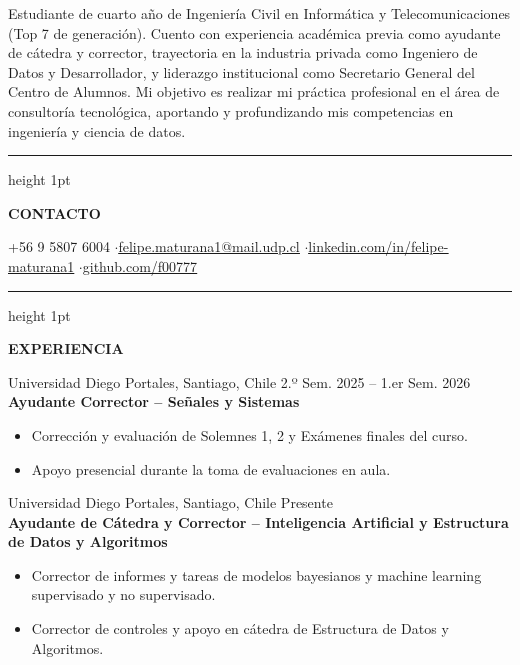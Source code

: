 \documentclass[10pt,a4paper]{article}
\newcommand{\cvsection}[1]{
    \vspace{1em}
    \hrule height 1pt
    \vspace{0.4em}
    \begin{center}
        \textbf{\large #1}
    \end{center}
    \vspace{-0.5em}
}
\begin{document}
\pagestyle{empty}

\begin{center}
    \noindent{}
\end{center}


\vspace{0.3em}
Estudiante de cuarto año de Ingeniería Civil en Informática y Telecomunicaciones (Top 7 de generación). Cuento con experiencia académica previa como ayudante de cátedra y corrector, trayectoria en la industria privada como Ingeniero de Datos y Desarrollador, y liderazgo institucional como Secretario General del Centro de Alumnos. Mi objetivo es realizar mi práctica profesional en el área de consultoría tecnológica, aportando y profundizando mis competencias en ingeniería y ciencia de datos.

\cvsection{CONTACTO}
\begin{center}
    \small +56 9 5807 6004 \enspace$\cdot$\enspace \href{mailto:felipe.maturana1@mail.udp.cl}{\underline{felipe.maturana1@mail.udp.cl}} \enspace$\cdot$\enspace \href{https://www.linkedin.com/in/felipe-maturana1}{\underline{linkedin.com/in/felipe-maturana1}} \enspace$\cdot$\enspace \href{https://github.com/f00777}{\underline{github.com/f00777}}
\end{center}

\cvsection{EXPERIENCIA}

\noindent Universidad Diego Portales, Santiago, Chile \hfill 2.º Sem. 2025 – 1.er Sem. 2026\\[0.2em]
\textbf{Ayudante Corrector – Señales y Sistemas}
\vspace{-0.3em}
\begin{itemize}[leftmargin=1.5em, itemsep=2pt, parsep=0pt]
    \item Corrección y evaluación de Solemnes 1, 2 y Exámenes finales del curso.
    \item Apoyo presencial durante la toma de evaluaciones en aula.
\end{itemize}

\vspace{0.8em}
\noindent Universidad Diego Portales, Santiago, Chile \hfill Presente\\[0.2em]
\textbf{Ayudante de Cátedra y Corrector – Inteligencia Artificial y Estructura de Datos y Algoritmos}
\vspace{-0.3em}
\begin{itemize}[leftmargin=1.5em, itemsep=2pt, parsep=0pt]
    \item Corrector de informes y tareas de modelos bayesianos y machine learning supervisado y no supervisado.
    \item Corrector de controles y apoyo en cátedra de Estructura de Datos y Algoritmos.
\end{itemize}
\end{document}
